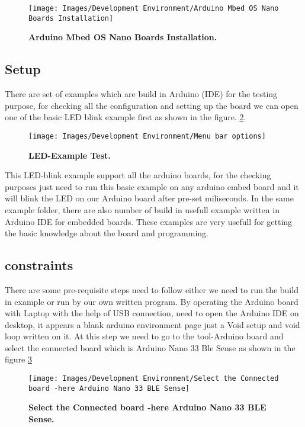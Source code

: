 \begin{figure}[H]\centering
	\texttt{[image: Images/Development Environment/Arduino Mbed OS Nano Boards Installation]}
	\caption{\textbf{Arduino Mbed OS Nano Boards Installation.}}
	\label{fig:Arduino Mbed OS Nano Boards Installation}		
\end{figure}



\subsection{Setup}
There are set of examples which are build in Arduino (IDE) for the testing purpose, for checking all the configuration and setting up the board we can open one of the basic LED blink example first as shown in the figure.  \ref{fig:LED-Example Test}.



\begin{figure}[H]\centering
	\texttt{[image: Images/Development Environment/Menu bar options]}
	\caption{\textbf{LED-Example Test.}}
	\label{fig:LED-Example Test}		
\end{figure}
This LED-blink example support all the arduino boards, for the checking purposes just need to run this basic example on any arduino embed board and it will blink the LED on our Arduino board after pre-set miliseconds. In the same example folder, there are also number of build in usefull example written in Arduino IDE for embedded boards. These examples are very usefull for getting the basic knowledge about the board and programming.

\subsection{constraints}
There are some pre-requisite steps need to follow either we need to run the build in example or run by our own written program. By operating the Arduino board with Laptop with the help of USB connection, need to open the Arduino IDE on desktop, it appears a blank arduino environment page just a Void setup and void loop written on it. At this step we need to go to the tool-Arduino board and select the connected board which is Arduino Nano 33 Ble Sense as shown in the figure   \ref{fig:Select the Connected board -here Arduino Nano 33 BLE Sense}

\begin{figure}[H]\centering
	\texttt{[image: Images/Development Environment/Select the Connected board -here Arduino Nano 33 BLE Sense]}
	\caption{\textbf{Select the Connected board -here Arduino Nano 33 BLE Sense.}}
	\label{fig:Select the Connected board -here Arduino Nano 33 BLE Sense}		
\end{figure}
